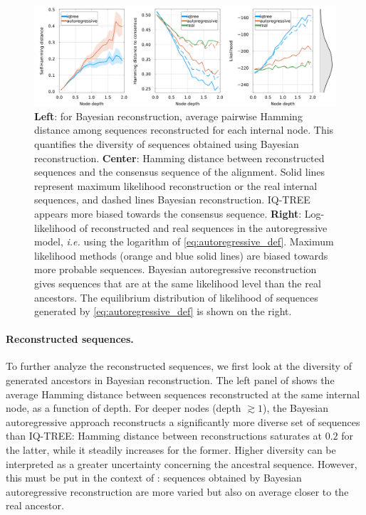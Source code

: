 \begin{figure}
	\centering
	\includegraphics[width = \textwidth]{figures/diversity_likelihood_arnet_PF00072.png}
	\caption{
		\textbf{Left}: for Bayesian reconstruction, average pairwise Hamming distance among sequences reconstructed for each internal node. This quantifies the diversity of sequences obtained using Bayesian reconstruction. 
		\textbf{Center}: Hamming distance between reconstructed sequences and the consensus sequence of the alignment. Solid lines represent maximum likelihood reconstruction or the real internal sequences, and dashed lines Bayesian reconstruction. IQ-TREE appears more biased towards the consensus sequence. 
		\textbf{Right}: Log-likelihood of reconstructed and real sequences in the autoregressive model, \emph{i.e.} using the logarithm of \eqref{eq:autoregressive_def}. 
		Maximum likelihood methods (orange and blue solid lines) are biased towards more probable sequences. 
		Bayesian autoregressive reconstruction gives sequences that are at the same likelihood level than the real ancestors. The equilibrium distribution of likelihood of sequences generated by \eqref{eq:autoregressive_def} is shown on the right. 
	}
	\label{fig:diversity_likelihood_arnet}
\end{figure}

\paragraph*{Reconstructed sequences.} To further analyze the reconstructed sequences, we first look at the diversity of generated ancestors in Bayesian reconstruction. 
The left panel of  shows the average Hamming distance between sequences reconstructed at the same internal node, as a function of depth. 
For deeper nodes (depth $\gtrsim 1$), the Bayesian autoregressive approach reconstructs a significantly more diverse set of sequences than IQ-TREE: Hamming distance between reconstructions saturates at $0.2$ for the latter, while it steadily increases for the former. 
Higher diversity can be interpreted as a greater uncertainty concerning the ancestral sequence. 
However, this must be put in the context of : sequences obtained by Bayesian autoregressive reconstruction are more varied but also on average closer to the real ancestor. 

